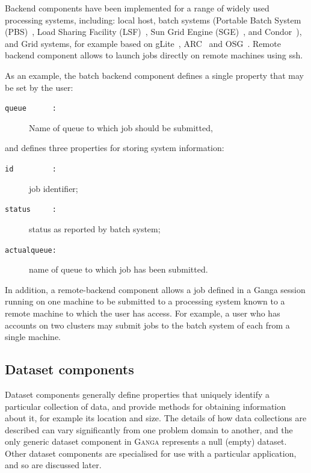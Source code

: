 \documentclass{elsart}
\def\ganga {\textsc{Ganga}\xspace}
\def\grid {Grid\xspace}
\newcommand{\code}[1]{\texttt{#1}}
\begin{document}
Backend components have been implemented for a range of widely used
processing systems, including: local host, batch systems
(Portable Batch System (PBS)~\cite{henderson_1995},
Load Sharing Facility (LSF)~\cite{schwickerath_2008},
Sun Grid Engine (SGE)~\cite{gentzsch_2001},
and Condor~\cite{thain_2005}), and \grid systems, for example  based on
gLite~\cite{andreetto_2008}, ARC~\cite{ellert_2007} and OSG~\cite{OSG}.
Remote backend component allows to launch jobs directly on remote machines 
using ssh.  


As an example, the batch backend component defines a
single property that may be set by the user:
\begin{description}
\item[\code{queue~~~~~~:}] Name of queue to which job should be submitted,
\end{description}
and defines three properties for storing system information:
\begin{description}
\item[\code{id~~~~~~~~~:}] job identifier;
\item[\code{status~~~~~:}] status as reported by batch system;
\item[\code{actualqueue:}] name of queue to which job has been submitted.
\end{description}

In addition, a remote-backend component allows a job defined in a Ganga
session running on one machine to be submitted to a processing system
known to a remote machine to which the user has access.  For example,
a user who has accounts on two clusters may submit jobs to the batch system
of each from a single machine.

\subsection{Dataset components}
Dataset components generally define properties that uniquely identify a
particular collection of data, and provide methods for obtaining information
about it, for example its location and size. The details of how data
collections are described can vary significantly from one problem domain to
another, and the only generic dataset component in \ganga represents a null
(empty) dataset.  Other dataset components are specialised for use with a
particular application, and so are discussed later.
\end{document}
